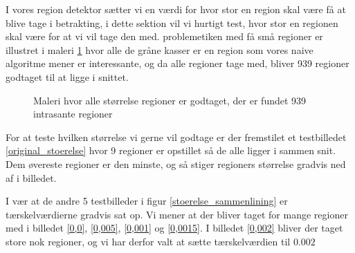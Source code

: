 {\sffamily
I vores region detektor sætter vi en værdi for hvor stor en region skal
være få at blive tage i betrakting, i dette sektion vil vi hurtigt test,
hvor stor en regionen skal være for at vi vil tage den med. problemetiken
med få små regioner er illustret i maleri \ref{alt_med} hvor alle de
gråne kasser er en region som vores naive algoritme mener er
interessante, og da alle regioner tage med, bliver 939 regioner godtaget
til at ligge i snittet. 
}

\begin{figure}[¡h]
    \setlength\fboxsep{0pt}
    \setlength\fboxrule{0.5pt}
    \begin{center}
    \end{center}
    \caption{Maleri hvor alle størrelse regioner er godtaget, der er fundet 939 intrasante regioner}
	\label{alt_med}
\end{figure}
For at teste hvilken størrelse vi gerne vil godtage er der fremstilet et
testbilledet \ref{original_stoerelse} hvor 9 regioner er opstillet så de
alle ligger i sammen snit. Dem øvereste regioner er den minste, og så
stiger regioners størrelse gradvis ned af i billedet.

I vær at de andre 5 testbilleder i figur \ref{stoerelse_sammenlining} er
tærskelværdierne gradvis sat op. Vi mener at der bliver taget for mange
regioner med i billedet \ref{0,0}, \ref{0,005}, \ref{0,001} og
\ref{0,0015}. I billedet \ref{0,002} bliver der taget store nok
regioner, og vi har derfor valt at sætte tærskelværdien til $0.002$
 
